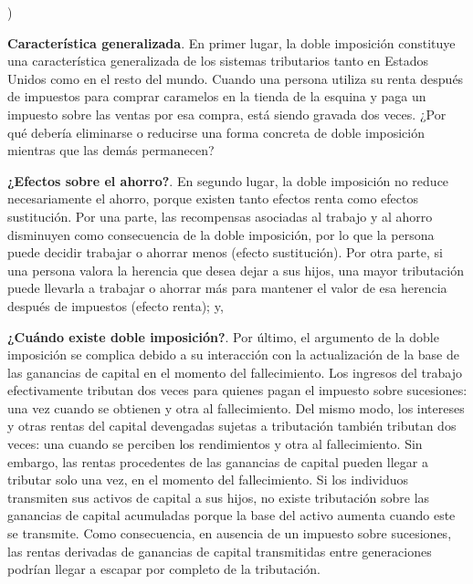 \documentclass[10pt,a4paper]{article}
\newcounter{alphaitem}
\newenvironment{la}
      {\begin{list}{\alph{alphaitem})}{%
          \usecounter{alphaitem}%
          \setlength{\leftmargin}{1cm}%
          \setlength{\parskip}{3pt}%
          \setlength{\itemsep}{0pt}%
          \setlength{\parsep}{0pt}%
      }}
      {\end{list}}
\begin{document}
\begin{la}
    \item \textbf{Característica generalizada}. En primer lugar, la doble imposición constituye una característica generalizada de los sistemas tributarios tanto en Estados Unidos como en el resto del mundo. Cuando una persona utiliza su renta después de impuestos para comprar caramelos en la tienda de la esquina y paga un impuesto sobre las ventas por esa compra, está siendo gravada dos veces. ¿Por qué debería eliminarse o reducirse una forma concreta de doble imposición mientras que las demás permanecen? 
    \item \textbf{¿Efectos sobre el ahorro?}. En segundo lugar, la doble imposición no reduce necesariamente el ahorro, porque existen tanto efectos renta como efectos sustitución. Por una parte, las recompensas asociadas al trabajo y al ahorro disminuyen como consecuencia de la doble imposición, por lo que la persona puede decidir trabajar o ahorrar menos (efecto sustitución). Por otra parte, si una persona valora la herencia que desea dejar a sus hijos, una mayor tributación puede llevarla a trabajar o ahorrar más para mantener el valor de esa herencia después de impuestos (efecto renta); y,
    \item \textbf{¿Cuándo existe doble imposición?}. Por último, el argumento de la doble imposición se complica debido a su interacción con la actualización de la base de las ganancias de capital en el momento del fallecimiento. Los ingresos del trabajo efectivamente tributan dos veces para quienes pagan el impuesto sobre sucesiones: una vez cuando se obtienen y otra al fallecimiento. Del mismo modo, los intereses y otras rentas del capital devengadas sujetas a tributación también tributan dos veces: una cuando se perciben los rendimientos y otra al fallecimiento. Sin embargo, las rentas procedentes de las ganancias de capital pueden llegar a tributar solo una vez, en el momento del fallecimiento. Si los individuos transmiten sus activos de capital a sus hijos, no existe tributación sobre las ganancias de capital acumuladas porque la base del activo aumenta cuando este se transmite. Como consecuencia, en ausencia de un impuesto sobre sucesiones, las rentas derivadas de ganancias de capital transmitidas entre generaciones podrían llegar a escapar por completo de la tributación.
\end{la}
\end{document}
